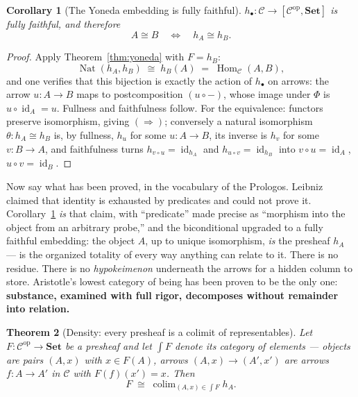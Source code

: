 \documentclass[11pt]{article}
\theoremstyle{plain}
\newtheorem{theorem}{Theorem}[section]
\newtheorem{corollary}[theorem]{Corollary}
\theoremstyle{definition}
\theoremstyle{remark}
\newcommand{\C}{\mathcal{C}}
\newcommand{\Set}{\mathbf{Set}}
\newcommand{\Hom}{\operatorname{Hom}}
\newcommand{\Nat}{\operatorname{Nat}}
\newcommand{\id}{\operatorname{id}}
\newcommand{\op}{\mathrm{op}}
\newcommand{\El}{\textstyle\int}
\newcommand{\colim}{\operatorname{colim}}
\begin{document}
\begin{corollary}[The Yoneda embedding is fully faithful]\label{cor:embed}
$h_{\bullet}\colon \C \to [\C^{\op},\Set]$ is fully faithful, and therefore
\[
A \cong B \quad\Longleftrightarrow\quad h_A \cong h_B .
\]
\end{corollary}

\begin{proof}
Apply Theorem~\ref{thm:yoneda} with $F = h_B$:
\[
\Nat(h_A, h_B) \;\cong\; h_B(A) \;=\; \Hom_\C(A,B),
\]
and one verifies that this bijection is exactly the action of $h_\bullet$ on arrows: the arrow $u\colon A \to B$ maps to postcomposition $(u \circ -)$, whose image under $\Phi$ is $u \circ \id_A = u$. Fullness and faithfulness follow. For the equivalence: functors preserve isomorphism, giving $(\Rightarrow)$; conversely a natural isomorphism $\theta\colon h_A \cong h_B$ is, by fullness, $h_u$ for some $u\colon A \to B$, its inverse is $h_v$ for some $v\colon B \to A$, and faithfulness turns $h_{v\circ u} = \id_{h_A}$ and $h_{u \circ v} = \id_{h_B}$ into $v \circ u = \id_A$, $u \circ v = \id_B$.
\end{proof}

Now say what has been proved, in the vocabulary of the Prologos. Leibniz claimed that identity is exhausted by predicates and could not prove it. Corollary~\ref{cor:embed} \emph{is} that claim, with ``predicate'' made precise as ``morphism into the object from an arbitrary probe,'' and the biconditional upgraded to a fully faithful embedding: the object $A$, up to unique isomorphism, \emph{is} the presheaf $h_A$ --- is the organized totality of every way anything can relate to it. There is no residue. There is no \emph{hypokeimenon} underneath the arrows for a hidden column to store. Aristotle's lowest category of being has been proven to be the only one: \textbf{substance, examined with full rigor, decomposes without remainder into relation.}

\begin{theorem}[Density: every presheaf is a colimit of representables]\label{thm:density}
Let $F\colon \C^{\op} \to \Set$ be a presheaf and let $\El F$ denote its category of elements --- objects are pairs $(A, x)$ with $x \in F(A)$, arrows $(A,x) \to (A',x')$ are arrows $f\colon A \to A'$ in $\C$ with $F(f)(x') = x$. Then
\[
F \;\cong\; \colim_{(A,x) \in \El F} h_A .
\]
\end{theorem}
\end{document}

